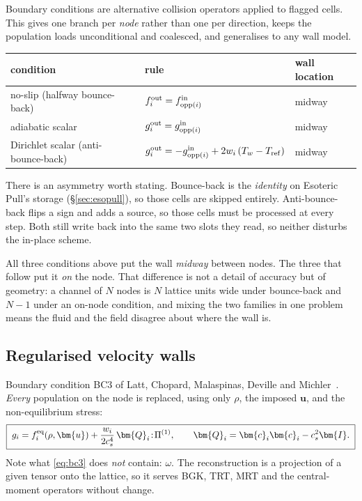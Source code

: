 \documentclass[11pt,a4paper]{article}
\newcommand{\cs}{c_s}
\newcommand{\ci}{\bm{c}_i}
\newcommand{\uu}{\bm{u}}
\begin{document}
Boundary conditions are alternative collision operators applied to flagged cells.
This gives one branch per \emph{node} rather than one per direction, keeps the
population loads unconditional and coalesced, and generalises to any wall model.

\begin{center}\small
\begin{tabular}{lll}
\toprule
condition & rule & wall location \\
\midrule
no-slip (halfway bounce-back) & $f_i^{\rm out} = f_{\mathrm{opp}(i)}^{\rm in}$ & midway \\
adiabatic scalar              & $g_i^{\rm out} = g_{\mathrm{opp}(i)}^{\rm in}$ & midway \\
Dirichlet scalar (anti-bounce-back) &
  $g_i^{\rm out} = -g_{\mathrm{opp}(i)}^{\rm in} + 2w_i\,(T_w - T_{\rm ref})$ & midway \\
\bottomrule
\end{tabular}
\end{center}

\noindent There is an asymmetry worth stating. Bounce-back is the \emph{identity}
on Esoteric Pull's storage (\S\ref{sec:esopull}), so those cells are skipped
entirely. Anti-bounce-back flips a sign and adds a source, so those cells must be
processed at every step. Both still write back into the same two slots they read,
so neither disturbs the in-place scheme.

\medskip
\noindent All three conditions above put the wall \emph{midway} between nodes.
The three that follow put it \emph{on} the node. That difference is not a detail
of accuracy but of geometry: a channel of $N$ nodes is $N$ lattice units wide
under bounce-back and $N-1$ under an on-node condition, and mixing the two
families in one problem means the fluid and the field disagree about where the
wall is.

\subsection{Regularised velocity walls}
\label{sec:regularized}

Boundary condition BC3 of Latt, Chopard, Malaspinas, Deville and
Michler~\cite{latt2008}. \emph{Every} population on the node is replaced, using
only $\rho$, the imposed $\uu$, and the non-equilibrium stress:
\begin{equation}
  \boxed{\;
  g_i = f_i^{\rm eq}(\rho,\uu) + \frac{w_i}{2\cs^4}\,\bm{Q}_i\!:\!\Pi^{(1)},
  \qquad \bm{Q}_i = \ci\ci - \cs^2\bm{I}. \;}
  \label{eq:bc3}
\end{equation}
Note what \eqref{eq:bc3} does \emph{not} contain: $\omega$. The reconstruction is
a projection of a given tensor onto the lattice, so it serves BGK, TRT, MRT and
the central-moment operators without change.
\end{document}
